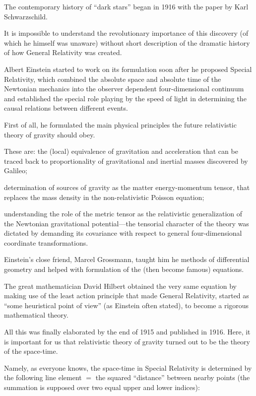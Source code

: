 The contemporary history of ``dark stars'' began in 1916 with the paper by Karl Schwarzschild. 

It is impossible to understand the revolutionary importance of this discovery (of which he himself was unaware) without short description of the dramatic history of how General Relativity was created. 

Albert Einstein started to work on its formulation soon after he proposed Special Relativity, which combined the absolute space and absolute time of the Newtonian mechanics into the observer dependent four-dimensional continuum and established the special role playing by the speed of light in determining the causal relations between different events. 

First of all, he formulated the main physical principles the future relativistic theory of gravity should obey. 

These are: the (local) equivalence of gravitation and acceleration that can be traced back to proportionality of gravitational and inertial masses discovered by Galileo; 

determination of sources of gravity as the matter energy-momentum tensor, that replaces the mass density in the non-relativistic Poisson equation; 

understanding the role of the metric tensor as the relativistic generalization of the Newtonian gravitational potential---the tensorial character of the theory was dictated by demanding its covariance with respect to general four-dimensional coordinate transformations. 

Einstein's close friend, Marcel Grossmann, taught him he methods of differential geometry and helped with formulation of the (then become famous) equations. 

The great mathematician David Hilbert obtained the very same equation by making use of the least action principle that made General Relativity, started as ``some heuristical point of view'' (as Einstein often stated), to become a rigorous mathematical theory. 

All this was finally elaborated by the end of 1915 and published in 1916. Here, it is important for us that relativistic theory of gravity turned out to be the theory of the space-time. 

Namely, as everyone knows, the space-time in Special Relativity is determined by the following line element $=$ the squared ``distance'' between  nearby points (the summation is supposed over two equal upper and lower indices): 

